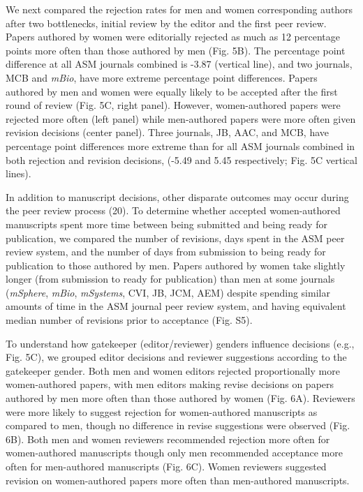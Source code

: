 \documentclass[11pt,]{article}
\begin{document}
We next compared the rejection rates for men and women corresponding
authors after two bottlenecks, initial review by the editor and the
first peer review. Papers authored by women were editorially rejected as
much as 12 percentage points more often than those authored by men (Fig.
5B). The percentage point difference at all ASM journals combined is
-3.87 (vertical line), and two journals, MCB and \emph{mBio}, have more
extreme percentage point differences. Papers authored by men and women
were equally likely to be accepted after the first round of review (Fig.
5C, right panel). However, women-authored papers were rejected more
often (left panel) while men-authored papers were more often given
revision decisions (center panel). Three journals, JB, AAC, and MCB,
have percentage point differences more extreme than for all ASM journals
combined in both rejection and revision decisions, (-5.49 and 5.45
respectively; Fig. 5C vertical lines).

In addition to manuscript decisions, other disparate outcomes may occur
during the peer review process (20). To determine whether accepted
women-authored manuscripts spent more time between being submitted and
being ready for publication, we compared the number of revisions, days
spent in the ASM peer review system, and the number of days from
submission to being ready for publication to those authored by men.
Papers authored by women take slightly longer (from submission to ready
for publication) than men at some journals (\emph{mSphere}, \emph{mBio},
\emph{mSystems}, CVI, JB, JCM, AEM) despite spending similar amounts of
time in the ASM journal peer review system, and having equivalent median
number of revisions prior to acceptance (Fig. S5).

To understand how gatekeeper (editor/reviewer) genders influence
decisions (e.g., Fig. 5C), we grouped editor decisions and reviewer
suggestions according to the gatekeeper gender. Both men and women
editors rejected proportionally more women-authored papers, with men
editors making revise decisions on papers authored by men more often
than those authored by women (Fig. 6A). Reviewers were more likely to
suggest rejection for women-authored manuscripts as compared to men,
though no difference in revise suggestions were observed (Fig. 6B). Both
men and women reviewers recommended rejection more often for
women-authored manuscripts though only men recommended acceptance more
often for men-authored manuscripts (Fig. 6C). Women reviewers suggested
revision on women-authored papers more often than men-authored
manuscripts.
\end{document}
